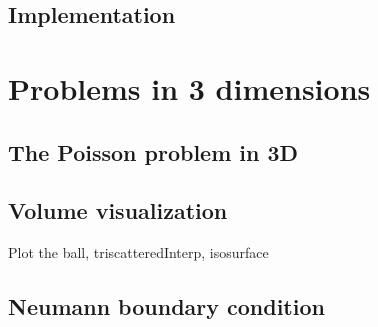 \documentclass[paper=a4, fontsize=11pt]{scrartcl} %
\begin{document}
\subsection{Implementation}

\section{Problems in 3 dimensions}
\subsection{The Poisson problem in 3D}
\subsection{Volume visualization}
Plot the ball, triscatteredInterp, isosurface
\subsection{Neumann boundary condition}
\end{document}
